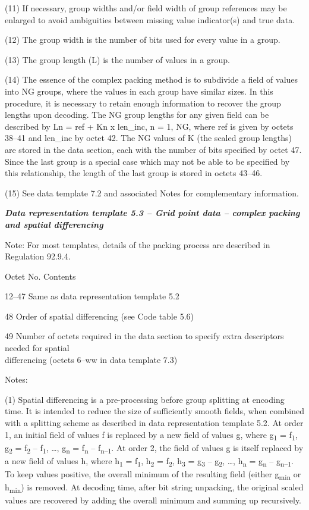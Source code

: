 (11) If necessary, group widths and/or field width of group references may be enlarged to avoid ambiguities between missing value indicator(s) and true data.

(12) The group width is the number of bits used for every value in a group.

(13) The group length (L) is the number of values in a group.

(14) The essence of the complex packing method is to subdivide a field of values into NG groups, where the values in each group have similar sizes. In this procedure, it is necessary to retain enough information to recover the group lengths upon decoding. The NG group lengths for any given field can be described by Ln = ref + Kn x len\_inc, n = 1, NG, where ref is given by octets 38--41 and len\_inc by octet 42. The NG values of K (the scaled group lengths) are stored in the data section, each with the number of bits specified by octet 47. Since the last group is a special case which may not be able to be specified by this relationship, the length of the last group is stored in octets 43--46.

(15) See data template 7.2 and associated Notes for complementary information.

\emph{\textbf{Data representation template 5.3 -- Grid point data -- complex packing and spatial differencing}}

Note: For most templates, details of the packing process are described in Regulation 92.9.4.

Octet No. Contents

12--47 Same as data representation template 5.2

48 Order of spatial differencing (see Code table 5.6)

49 Number of octets required in the data section to specify extra descriptors needed for spatial\\
differencing (octets 6--ww in data template 7.3)

Notes:

(1) Spatial differencing is a pre-processing before group splitting at encoding time. It is intended to reduce the size of sufficiently smooth fields, when combined with a splitting scheme as described in data representation template 5.2. At order 1, an initial field of values f is replaced by a new field of values g, where g\textsubscript{1} = f\textsubscript{1}, g\textsubscript{2} = f\textsubscript{2} -- f\textsubscript{1}, \ldots, g\textsubscript{n} = f\textsubscript{n} -- f\textsubscript{n--1}. At order 2, the field of values g is itself replaced by a new field of values h, where h\textsubscript{1} = f\textsubscript{1}, h\textsubscript{2} = f\textsubscript{2}, h\textsubscript{3} = g\textsubscript{3} -- g\textsubscript{2}, \ldots, h\textsubscript{n} = g\textsubscript{n} -- g\textsubscript{n--1}. To keep values positive, the overall minimum of the resulting field (either g\textsubscript{min} or h\textsubscript{min}) is removed. At decoding time, after bit string unpacking, the original scaled values are recovered by adding the overall minimum and summing up recursively.

